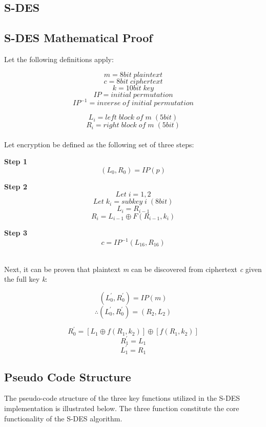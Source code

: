 \documentclass[]{article}
\begin{document}
\vspace*{-0.8cm}
\begin{center}
	\section*{S-DES}
\end{center}

\vspace*{0.8cm}
\subsection*{S-DES Mathematical Proof}

Let the following definitions apply:

$$m = 8bit\;plaintext$$
$$c = 8bit\;ciphertext$$
$$k = 10bit\;key$$
$$IP = initial\;permutation$$
$$IP^{-1} = inverse\;of\;initial\;permutation$$

$$L_i = left\;block\;of\;m\;(5bit)$$
$$R_i = right\;block\;of\;m\;(5bit)$$\\

Let encryption be defined as the following set of three steps:\\

\begin{center}
\textbf{Step 1}
$$(L_0,R_0)=IP(p)$$

\textbf{Step 2}
$$Let\;i=1,2$$
$$Let\;k_i=subkey\;i\;(8bit)$$
$$L_i=R_{i-1}$$
$$R_i=L_{i-1}\oplus F(R_{i-1},k_i)$$

\textbf{Step 3}
$$c=IP^{-1}(L_{16},R_{16})$$\\
\end{center}

Next, it can be proven that plaintext \textit{m} can be discovered from ciphertext \textit{c} given the full key \textit{k}:

$$(L^{'}_0,R^{'}_0)=IP(m)$$
$$\therefore (L^{'}_0,R^{'}_0)=(R_2,L_2)$$

$$R^{'}_0=[L_1\oplus f(R_1,k_2)]\oplus[f(R_1,k_2)]$$
$$R^{'}_1=L_1$$
$$L^{'}_1=R_1$$



\newpage
\subsection*{Pseudo Code Structure}

The pseudo-code structure of the three key functions utilized in the S-DES implementation is illustrated below. The three function constitute the core functionality of the S-DES algorithm.\\
\end{document}
